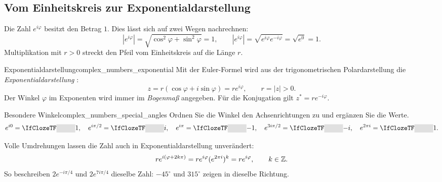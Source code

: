 \clearpage
\subsection{Vom Einheitskreis zur Exponentialdarstellung}
Die Zahl $e^{i\varphi}$ besitzt den Betrag $1$. Dies lässt sich auf zwei
Wegen nachrechnen:
\[
  |e^{i\varphi}|=\sqrt{\cos^2\varphi+\sin^2\varphi}=1,
  \qquad
  |e^{i\varphi}|=\sqrt{e^{i\varphi}e^{-i\varphi}}=\sqrt{e^0}=1.
\]
Multiplikation mit $r>0$ streckt den Pfeil vom Einheitskreis auf die Länge $r$.
\begin{center}
\end{center}
\begin{DefinitionBox}{Exponentialdarstellung}{complex_numbers_exponential}
  Mit der Euler-Formel wird aus der trigonometrischen Polardarstellung die
  \emph{Exponentialdarstellung} :
  \[
    z=r(\cos\varphi+i\sin\varphi)=re^{i\varphi},\qquad r=|z|>0.
  \]
  Der Winkel $\varphi$ im Exponenten wird immer im \emph{Bogenmaß} angegeben.
  Für die Konjugation gilt $z^*=re^{-i\varphi}$.
\end{DefinitionBox}
\begin{ExampleBox}{Besondere Winkel}{complex_numbers_special_angles}
  Ordnen Sie die Winkel den Achsenrichtungen zu und ergänzen Sie die Werte.
  \[
    e^{i0}=\Cloze{1cm}{1},\quad
    e^{i\pi/2}=\Cloze{1cm}{i},\quad
    e^{i\pi}=\Cloze{1cm}{-1},\quad
    e^{3i\pi/2}=\Cloze{1cm}{-i},\quad
    e^{2\pi i}=\Cloze{1cm}{1}.
  \]
\end{ExampleBox}
Volle Umdrehungen lassen die Zahl auch in Exponentialdarstellung unverändert:
\[
  re^{i(\varphi+2k\pi)}
    =re^{i\varphi}(e^{2\pi i})^k=re^{i\varphi},\qquad k\in\mathbb{Z}.
\]
So beschreiben $2e^{-i\pi/4}$ und $2e^{7i\pi/4}$ dieselbe Zahl:
$-45^\circ$ und $315^\circ$ zeigen in dieselbe Richtung.

\clearpage
